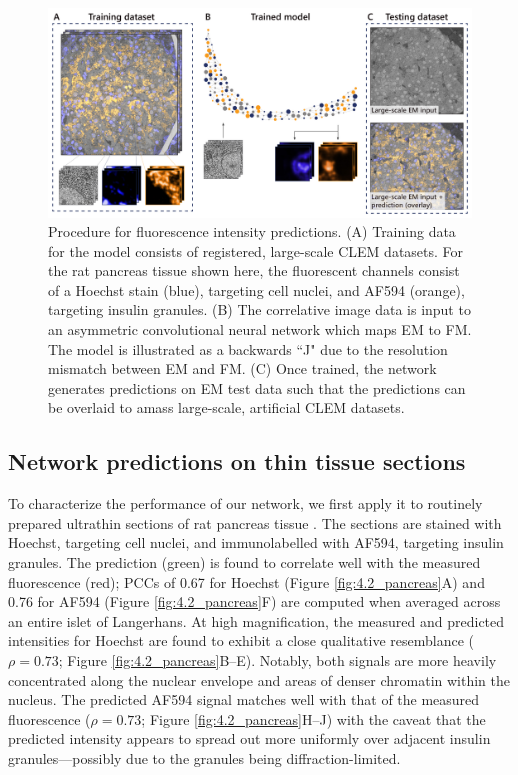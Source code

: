 \begin{figure}[!tb]
    \centering
    \includegraphics[width=\linewidth]{chapter-4/figures_PDF/fig4-1_overview.pdf}
    \caption{Procedure for fluorescence intensity predictions.
    (A) Training data for the model consists of registered, large-scale CLEM datasets. For the rat pancreas tissue shown here, the fluorescent channels consist of a Hoechst stain (blue), targeting cell nuclei, and AF594 (orange), targeting insulin granules.
    (B) The correlative image data is input to an asymmetric convolutional neural network which maps EM to FM. The model is illustrated as a backwards ``J" due to the resolution mismatch between EM and FM.
    (C) Once trained, the network generates predictions on EM test data such that the predictions can be overlaid to amass large-scale, artificial CLEM datasets.}
    \label{fig:4.1_overview}
\end{figure}


\subsection{Network predictions on thin tissue sections}
\label{sec:4results_pancreas}

To characterize the performance of our network, we first apply it to routinely prepared ultrathin sections of rat pancreas tissue \cite{ravelli2013destruction}. The sections are stained with Hoechst, targeting cell nuclei, and immunolabelled with AF594, targeting insulin granules. The prediction (green) is found to correlate well with the measured fluorescence (red); PCCs of 0.67 for Hoechst (Figure \ref{fig:4.2_pancreas}A) and 0.76 for AF594 (Figure \ref{fig:4.2_pancreas}F) are computed when averaged across an entire islet of Langerhans. At high magnification, the measured and predicted intensities for Hoechst are found to exhibit a close qualitative resemblance ($\rho\!=\!\text{0.73}$; Figure \ref{fig:4.2_pancreas}B--E). Notably, both signals are more heavily concentrated along the nuclear envelope and areas of denser chromatin within the nucleus. The predicted AF594 signal matches well with that of the measured fluorescence ($\rho\!=\!\text{0.73}$; Figure \ref{fig:4.2_pancreas}H--J) with the caveat that the predicted intensity appears to spread out more uniformly over adjacent insulin granules---possibly due to the granules being diffraction-limited.


